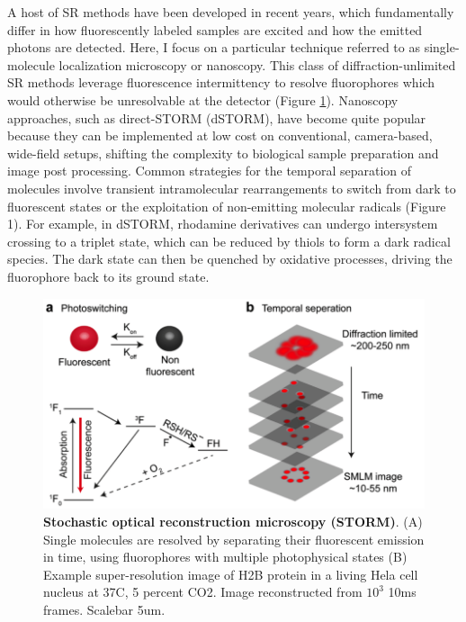 A host of SR methods have been developed in recent years, which fundamentally differ in how fluorescently labeled samples are excited and how the emitted photons are detected. Here, I focus on a particular technique referred to as single-molecule localization microscopy or nanoscopy. This class of diffraction-unlimited SR methods leverage fluorescence intermittency to resolve fluorophores which would otherwise be unresolvable at the detector (Figure \ref{fig:fig1}). Nanoscopy approaches, such as direct-STORM (dSTORM), have become quite popular because they can be implemented at low cost on conventional, camera-based, wide-field setups, shifting the complexity to biological sample preparation and image post processing. Common strategies for the temporal separation of molecules involve transient intramolecular rearrangements to switch from dark to fluorescent states or the exploitation of non-emitting molecular radicals (Figure 1). For example, in dSTORM, rhodamine derivatives can undergo intersystem crossing to a triplet state, which can be reduced by thiols to form a dark radical species. The dark state can then be quenched by oxidative processes, driving the fluorophore back to its ground state. 

\begin{figure}[t]
\centering
\includegraphics[width=12cm]{media/Intro.png}
\caption{\textbf{Stochastic optical reconstruction microscopy (STORM)}. (A) Single molecules are resolved by separating their fluorescent emission in time, using fluorophores with multiple photophysical states (B) Example super-resolution image of H2B protein in a living Hela cell nucleus at 37C, 5 percent CO2. Image reconstructed from $10^{3}$ 10ms frames. Scalebar 5um.}
\label{fig:fig1}
\end{figure}

